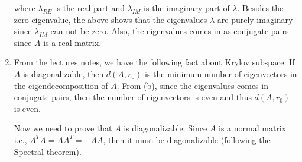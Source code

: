 \begin{enumerate}
where $\lambda_{RE}$ is the real part and $\lambda_{IM}$ is the imaginary part of $\lambda$.  Besides the zero eigenvalue, the above shows that the eigenvalues $\lambda$ are purely imaginary since $\lambda_{IM}$ can not be zero. Also, the eigenvalues comes in as conjugate pairs since $A$ is a real matrix. 

\item From the lectures notes, we have the following fact about Krylov subspace. If $A$ is diagonalizable, then $d(A,r_{0})$ is the minimum number of eigenvectors in the eigendecomposition of $A$. From (b), since the eigenvalues comes in conjugate pairs, then the number of eigenvectors is even and thus $d(A,r_{0})$ is even. 

Now we need to prove that $A$ is diagonalizable. Since $A$ is a normal matrix i.e., $A^{T}A = AA^{T} = -AA $, then it must be diagonalizable (following the Spectral theorem). 




\end{enumerate}